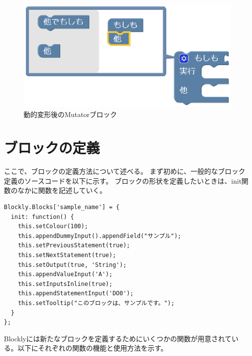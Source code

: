 \documentclass{risepaper}
\begin{document}
\begin{figure}[h]
\begin{center}
\includegraphics[scale=0.5]{img/mutator2.eps}
\caption{動的変形後のMutatorブロック}%
\label{fig:mutator2}
\end{center}%
\end{figure}%

   \section{ブロックの定義}
   
ここで、ブロックの定義方法について述べる。
まず初めに、一般的なブロック定義のソースコードを以下に示す。
ブロックの形状を定義したいときは、init関数のなかに関数を記述していく。

\begin{lstlisting}[basicstyle=\ttfamily\footnotesize]
Blockly.Blocks['sample_name'] = {
  init: function() {
    this.setColour(100);
    this.appendDummyInput().appendField("サンプル");
    this.setPreviousStatement(true);
    this.setNextStatement(true);
    this.setOutput(true, 'String');
    this.appendValueInput('A');
    this.setInputsInline(true);
    this.appendStatementInput('DO0');
    this.setTooltip("このブロックは、サンプルです。");
  }
};
\end{lstlisting}

Blocklyには新たなブロックを定義するためにいくつかの関数が用意されている。以下にそれぞれの関数の機能と使用方法を示す。
\end{document}
